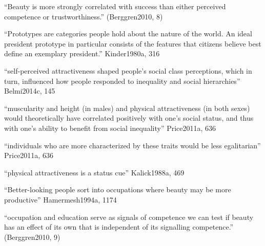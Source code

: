 		``Beauty is more strongly correlated with success than either perceived competence or trustworthiness.'' (Berggren2010, 8)

		``Prototypes are categories people hold about the nature of the world. An ideal president prototype in particular consists of the features that citizens believe best define an exemplary president.'' Kinder1980a, 316



``self-perceived attractiveness shaped people's social class perceptions, which in turn, influenced how people responded to inequality and social hierarchies'' Belmi2014c, 145

``muscularity and height (in males) and physical attractiveness (in both sexes) would theoretically have correlated positively with one’s social status, and thus with one's ability to benefit from social inequality'' Price2011a, 636

``individuals who are more characterized by these traits would be less egalitarian'' Price2011a, 636

``physical attractiveness is a status cue'' Kalick1988a, 469

``Better-looking people sort into occupations where beauty may be more productive'' Hamermesh1994a, 1174

``occupation and education serve as signals of competence we can test if beauty has an effect of its own that is independent of its signalling competence.'' (Berggren2010, 9)





	














